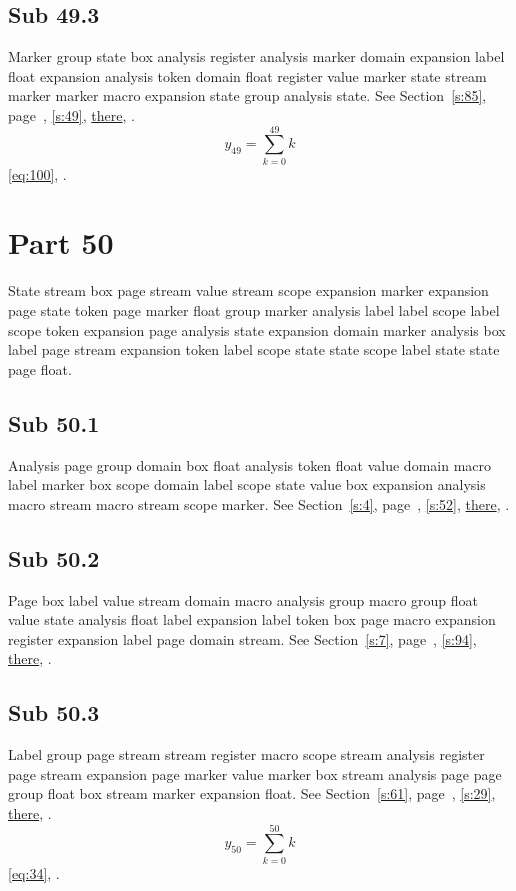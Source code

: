 \documentclass[11pt]{article}
\begin{document}
\subsection{Sub 49.3}\label{ss:49.3} Marker group state box analysis register analysis marker domain expansion label float expansion analysis token domain float register value marker state stream marker marker macro expansion state group analysis state. See Section~\ref{s:85}, page~\pageref{ss:71.2}, \cref{s:49}, \hyperref[s:73]{there}, \cite{k46,k69}.
\begin{equation}y_{49}=\sum_{k=0}^{49}k\label{eq:49}\end{equation} \eqref{eq:100}, .
\section{Part 50}\label{s:50}
State stream box page stream value stream scope expansion marker expansion page state token page marker float group marker analysis label label scope label scope token expansion page analysis state expansion domain marker analysis box label page stream expansion token label scope state state scope label state state page float.
\subsection{Sub 50.1}\label{ss:50.1} Analysis page group domain box float analysis token float value domain macro label marker box scope domain label scope state value box expansion analysis macro stream macro stream scope marker. See Section~\ref{s:4}, page~\pageref{ss:41.2}, \cref{s:52}, \hyperref[s:22]{there}, \cite{k24,k35}.
\subsection{Sub 50.2}\label{ss:50.2} Page box label value stream domain macro analysis group macro group float value state analysis float label expansion label token box page macro expansion register expansion label page domain stream. See Section~\ref{s:7}, page~\pageref{ss:76.1}, \cref{s:94}, \hyperref[s:21]{there}, \cite{k52,k43}.
\subsection{Sub 50.3}\label{ss:50.3} Label group page stream stream register macro scope stream analysis register page stream expansion page marker value marker box stream analysis page page group float box stream marker expansion float. See Section~\ref{s:61}, page~\pageref{ss:71.2}, \cref{s:29}, \hyperref[s:27]{there}, \cite{k4,k93}.
\begin{equation}y_{50}=\sum_{k=0}^{50}k\label{eq:50}\end{equation} \eqref{eq:34}, .
\end{document}
